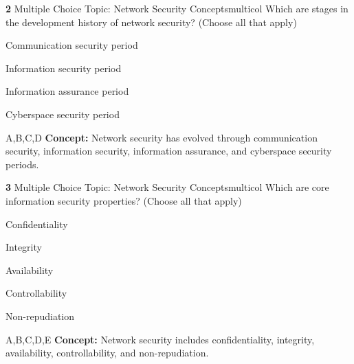 \documentclass[10pt,a4paper]{article}
\begin{document}
\begin{qcard}{\color{white}\textbf{2} \hfill \small Multiple Choice \textbar{} Topic: Network Security Concepts}{multicol}
Which are stages in the development history of network security? (Choose all that apply)

\begin{qoptions}
\item Communication security period
\item Information security period
\item Information assurance period
\item Cyberspace security period
\end{qoptions}
\begin{explainbox}{A,B,C,D}
\textbf{Concept:} Network security has evolved through communication security, information security, information assurance, and cyberspace security periods.
\end{explainbox}
\end{qcard}

\begin{qcard}{\color{white}\textbf{3} \hfill \small Multiple Choice \textbar{} Topic: Network Security Concepts}{multicol}
Which are core information security properties? (Choose all that apply)

\begin{qoptions}
\item Confidentiality
\item Integrity
\item Availability
\item Controllability
\item Non-repudiation
\end{qoptions}
\begin{explainbox}{A,B,C,D,E}
\textbf{Concept:} Network security includes confidentiality, integrity, availability, controllability, and non-repudiation.
\end{explainbox}
\end{qcard}
\end{document}
